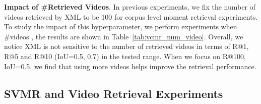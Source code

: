 \documentclass[runningheads]{llncs}
\newcommand{\ra}[1]{\renewcommand{\arraystretch}{#1}}
\begin{document}
\begin{table*}[!t]
\setlength{\tabcolsep}{0.3em}
\ra{1.}
\centering
\small
\caption{Impact of \#retrieved videos on TVR \textit{val} set, VCMR task.}
\label{tab:vcmr_num_video}
\end{table*}




\kern2mm
\noindent\textbf{Impact of \#Retrieved Videos}. In previous experiments, we fix the number of videos retrieved by XML to be 100 for corpus level moment retrieval experiments. To study the impact of this hyperparameter, we perform experiments when \#videos , the results are shown in Table~\ref{tab:vcmr_num_video}. Overall, we notice XML is not sensitive to the number of retrieved videos in terms of R@1, R@5 and R@10 (IoU=0.5, 0.7) in the tested range. When we focus on R@100, IoU=0.5, we find that using more videos helps improve the retrieval performance.


\subsection{SVMR and Video Retrieval Experiments}
\end{document}
